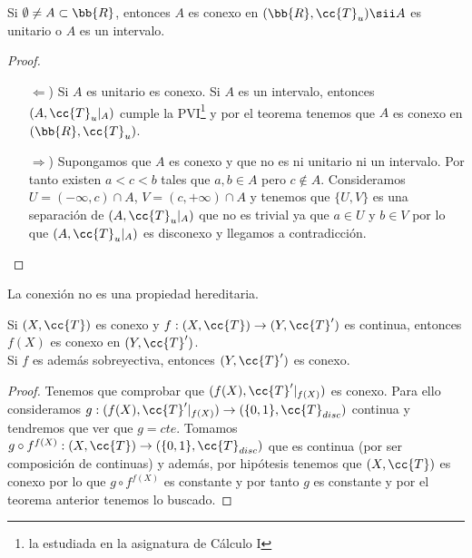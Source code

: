\begin{coro}
    Si $\emptyset\neq A \subset \bb{R}$, entonces $A$ es conexo en $(\bb{R}, \cc{T}_u)\sii A$ es unitario o $A$ es un intervalo.

    \begin{proof}\
        \begin{itemize}
            \item[$\Leftarrow$)] Si $A$ es unitario es conexo. Si $A$ es un intervalo, entonces $(A, \cc{T}_u|_A)$ cumple la PVI\footnote{la estudiada en la asignatura de Cálculo I} y por el teorema tenemos que $A$ es conexo en $(\bb{R}, \cc{T}_u)$.
            \item[$\Rightarrow$)] Supongamos que $A$ es conexo y que no es ni unitario ni un intervalo. Por tanto existen $a<c<b$ tales que $a,b\in A$ pero $c\notin A$. Consideramos $U=(-\infty, c)\cap A$, $V=(c, +\infty)\cap A$ y tenemos que $\{U,V\}$ es una separación de $(A, \cc{T}_u|_A)$ que no es trivial ya que $a\in U$ y $b\in V$ por lo que $(A, \cc{T}_u|_A)$ es disconexo y llegamos a contradicción.
        \end{itemize}
    \end{proof}
\end{coro}

\begin{observacion}
    La conexión no es una propiedad hereditaria.
    \endsquare
\end{observacion}

\begin{coro}
    Si $(X, \cc{T})$ es conexo y $f:(X, \cc{T})\to (Y, \cc{T}')$ es continua, entonces $f(X)$ es conexo en $(Y, \cc{T}')$. \\
    
    Si $f$ es además sobreyectiva, entonces $(Y, \cc{T}')$ es conexo.
    \begin{proof}
        Tenemos que comprobar que $(f(X), \cc{T}'|_{f(X)})$ es conexo. Para ello consideramos $g:(f(X), \cc{T}'|_{f(X)})\to (\{0,1\}, \cc{T}_{disc})$ continua y tendremos que ver que $g=cte$. Tomamos $g\circ f^{f(X)}:(X, \cc{T})\to (\{0,1\}, \cc{T}_{disc})$ que es continua (por ser composición de continuas) y además, por hipótesis tenemos que $(X, \cc{T})$ es conexo por lo que $g\circ f^{f(X)}$ es constante y por tanto $g$ es constante y por el teorema anterior tenemos lo buscado.

    \end{proof}
\end{coro}

